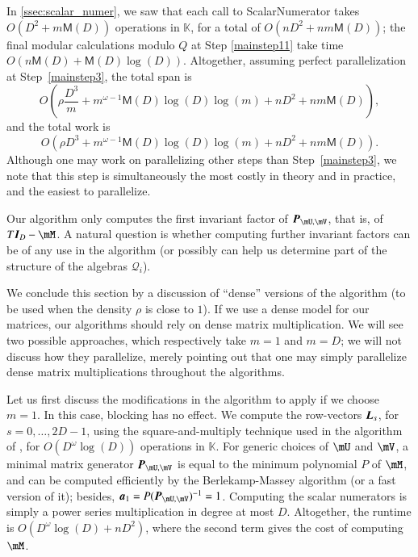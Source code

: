 \documentclass[final,1p,times,authoryear]{elsarticle}
\newcommand{\mat}[1]{\bm{\MakeUppercase{#1}}} %
\newcommand{\row}[1]{\bm{\MakeLowercase{#1}}} %
\newcommand{\minpoly}{P}
\newcommand{\residueI}{\mathscr{Q}}
\newcommand{\sqfree}{Q}
\newcommand{\density}{\rho}
\def\M {\ensuremath{\mathsf{M}}}
\def\K{\mathbb{K}}
\def\K {\ensuremath{\mathbb{K}}}
\begin{document}
In \cref{ssec:scalar_numer}, we saw that each call to {\sf ScalarNumerator}
takes $O(D^2 + m\M(D))$ operations in $\K$, for a total of $O(nD^2 + n
m\M(D))$; the final modular calculations modulo $\sqfree$ at Step \ref{mainstep11} take time $O(n\M(D) + \M(D) \log(D))$.
Altogether, assuming perfect parallelization 
at Step~\ref{mainstep3}, the total span is
$$O\left (\density \frac{D^3}m + m^{\omega-1} \M(D) \log(D) \log(m) + nD^2 + nm\M(D)\right ),$$
and the total work is
$$O\left (\density D^3 + m^{\omega-1} \M(D) \log(D) \log(m) + nD^2 +
nm\M(D)\right ).$$ Although one may work on parallelizing other steps than
Step~\ref{mainstep3}, we note that this step is simultaneously the most costly in
theory and in practice, and the easiest to parallelize. 


\begin{remark}
  Our algorithm only computes the first invariant factor of
  $\mat{P}_{\mU,\mV}$, that is, of $T \mat{I}_D-\mM$. A natural
  question is whether computing further invariant factors can be of
  any use in the algorithm (or possibly can help us determine part of
  the structure of the algebras $\residueI_i$).
\end{remark}

We conclude this section by a discussion of ``dense'' versions of the
algorithm (to be used when the density $\density$ is close to $1$). 
If we use a dense model for our matrices, our algorithms
should rely on dense matrix multiplication. We will see two possible
approaches, which respectively take $m=1$ and $m=D$; we will not
discuss how they parallelize, merely pointing out that one may simply
parallelize dense matrix multiplications throughout the algorithms.

Let us first discuss the modifications in the algorithm to apply if we choose
$m=1$. In this case, blocking has no effect. We compute the
row-vectors $\mat{L}_s$, for $s=0,\dots,2D-1$, using the
square-and-multiply technique used in the algorithm of \citet{Keller85},
for $O(D^\omega \log(D))$ operations in
$\K$. For generic choices of $\mU$ and $\mV$, a minimal matrix generator
$\mat{P}_{\mU,\mV}$ is equal to the minimum
polynomial $\minpoly$ of $\mM$, and can be computed efficiently by the
Berlekamp-Massey algorithm (or a fast version of it); besides,
$\row{a}_1 = P (\mat{P}_{\mU,\mV})^{-1} = 1$. Computing the scalar
numerators is simply a power series multiplication in degree at most
$D$. Altogether, the runtime is $O(D^{\omega} \log(D) + nD^2)$, where
the second term gives the cost of computing $\mM$.
\end{document}
